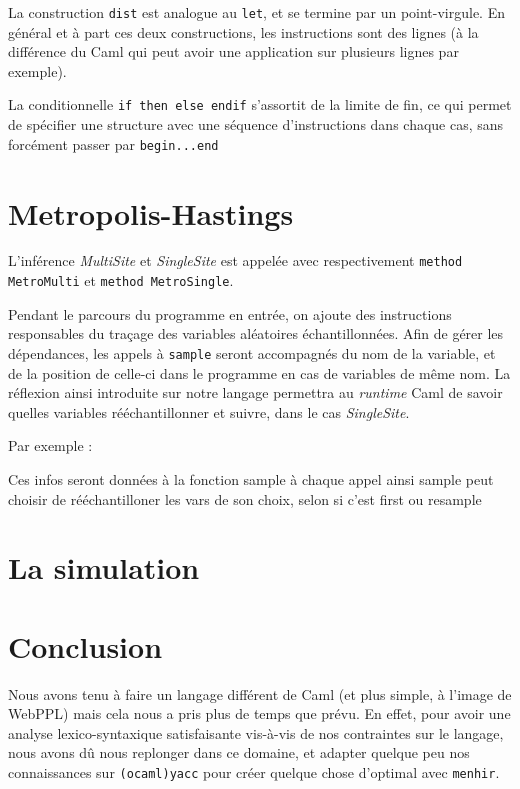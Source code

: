 \documentclass[svgnames]{article}
\begin{document}
La construction \lstinline{dist} est analogue au \lstinline{let}, et se termine par un point-virgule. En général et à part ces deux constructions, les instructions sont des lignes (à la différence du Caml qui peut avoir une application sur plusieurs lignes par exemple). 

La conditionnelle \lstinline{if then else endif} s'assortit de la limite de fin, ce qui permet de spécifier une structure avec une séquence d'instructions dans chaque cas, sans forcément passer par \lstinline{begin...end}

\section{Metropolis-Hastings}

L'inférence \emph{MultiSite} et \emph{SingleSite} est appelée   avec respectivement \lstinline{method MetroMulti}  et \lstinline{method MetroSingle}.


Pendant le parcours du programme en entrée, on ajoute des instructions responsables du traçage des variables aléatoires échantillonnées.
Afin de gérer les dépendances, les appels à \lstinline{sample} seront accompagnés du nom de la variable, et de la position de celle-ci dans le programme en cas de variables de même nom. La réflexion ainsi introduite sur notre langage permettra au \emph{runtime} Caml de savoir quelles variables rééchantillonner et suivre, dans le cas \emph{SingleSite}.

Par exemple :


Ces infos seront données à la fonction sample à chaque appel
ainsi sample peut choisir de rééchantilloner les vars de son choix, selon si c'est first ou resample

\section{La simulation}

 

\section{Conclusion}
 

Nous avons tenu à faire un langage différent de Caml (et plus simple, à l'image de WebPPL) mais cela nous a pris plus de temps que prévu. En effet, pour avoir une analyse lexico-syntaxique satisfaisante vis-à-vis de nos contraintes sur le langage, nous avons dû nous replonger dans ce domaine, et adapter quelque peu nos connaissances sur  \verb|(ocaml)yacc| pour créer quelque chose d'optimal avec \verb|menhir|.
\end{document}
